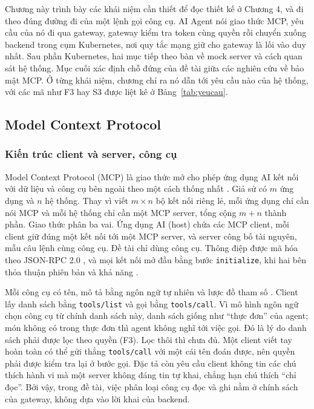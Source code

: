 \documentclass[a4paper]{article}
\begin{document}
Chương này trình bày các khái niệm cần thiết để đọc thiết kế ở Chương 4, và đi theo đúng đường đi của một lệnh gọi công cụ. AI Agent nói giao thức MCP, yêu cầu của nó đi qua gateway, gateway kiểm tra token cùng quyền rồi chuyển xuống backend trong cụm Kubernetes, nơi quy tắc mạng giữ cho gateway là lối vào duy nhất. Sau phần Kubernetes, hai mục tiếp theo bàn về mock server và cách quan sát hệ thống. Mục cuối xác định chỗ đứng của đề tài giữa các nghiên cứu về bảo mật MCP. Ở từng khái niệm, chương chỉ ra nó dẫn tới yêu cầu nào của hệ thống, với các mã như F3 hay S3 được liệt kê ở Bảng~\ref{tab:yeucau}.

\subsection{Model Context Protocol}

\subsubsection{Kiến trúc client và server, công cụ}

Model Context Protocol (MCP) là giao thức mở cho phép ứng dụng AI kết nối với dữ liệu và công cụ bên ngoài theo một cách thống nhất \parencite{mcp_spec}. Giả sử có $m$ ứng dụng và $n$ hệ thống. Thay vì viết $m \times n$ bộ kết nối riêng lẻ, mỗi ứng dụng chỉ cần nói MCP và mỗi hệ thống chỉ cần một MCP server, tổng cộng $m + n$ thành phần. Giao thức phân ba vai. Ứng dụng AI (host) chứa các MCP client, mỗi client giữ đúng một kết nối tới một MCP server, và server công bố tài nguyên, mẫu câu lệnh cùng công cụ. Đề tài chỉ dùng công cụ. Thông điệp được mã hóa theo JSON-RPC 2.0 \parencite{jsonrpc2}, và mọi kết nối mở đầu bằng bước \texttt{initialize}, khi hai bên thỏa thuận phiên bản và khả năng \parencite{mcp_lifecycle}.

Mỗi công cụ có tên, mô tả bằng ngôn ngữ tự nhiên và lược đồ tham số \parencite{mcp_tools}. Client lấy danh sách bằng \texttt{tools/list} và gọi bằng \texttt{tools/call}. Vì mô hình ngôn ngữ chọn công cụ từ chính danh sách này, danh sách giống như ``thực đơn'' của agent; món không có trong thực đơn thì agent không nghĩ tới việc gọi. Đó là lý do danh sách phải được lọc theo quyền (F3). Lọc thôi thì chưa đủ. Một client viết tay hoàn toàn có thể gửi thẳng \texttt{tools/call} với một cái tên đoán được, nên quyền phải được kiểm tra lại ở bước gọi. Đặc tả còn yêu cầu client không tin các chú thích hành vi mà một server không đáng tin tự khai, chẳng hạn chú thích ``chỉ đọc''. Bởi vậy, trong đề tài, việc phân loại công cụ đọc và ghi nằm ở chính sách của gateway, không dựa vào lời khai của backend.
\end{document}
